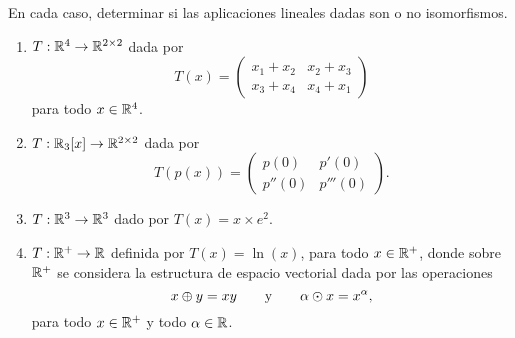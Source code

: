 \documentclass[a4,11pt]{aleph-notas}
\begin{document}
\begin{ejer}
    En cada caso, determinar si las aplicaciones lineales dadas son o no isomorfismos.
\begin{enumerate}
    \item $T:\mathbb{R}^4\to \mathbb{R}^{2\times 2}$ dada por 
    \[
        T(x) = \begin{pmatrix}
        x_1 + x_2 & x_2 + x_3\\
        x_3 + x_4 & x_4 + x_1
        \end{pmatrix}
    \]
    para todo $x\in\mathbb{R}^4$.
    \item $T:\mathbb{R}_3[x]\to \mathbb{R}^{2\times 2}$ dada por
    \[
        T(p(x)) = \begin{pmatrix}
        p(0) & p'(0) \\
        p''(0) & p'''(0)
        \end{pmatrix}.
    \]
    \item $T:\mathbb{R}^3 \to \mathbb{R}^3$ dado por $T(x) = x\times e^2$.
    \item $T:\mathbb{R}^+\to \mathbb{R}$ definida por $T(x)=\ln(x)$, para todo $x\in\mathbb{R}^+$, donde sobre $\mathbb{R}^+$ se considera la estructura de espacio vectorial dada por las operaciones
    \[
        x\oplus y = xy \qquad\text{y}\qquad \alpha\odot x = x^\alpha,
    \]
    para todo $x\in\mathbb{R}^+$ y todo $\alpha\in\mathbb{R}$.
\end{enumerate}
\end{ejer}
\end{document}

